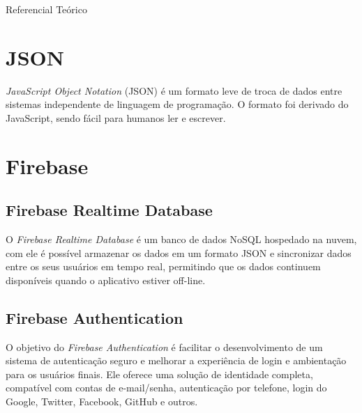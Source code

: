 \documentclass[
	12pt,				%
	openright,			%
	twoside,			%
	a4paper,			%
	english,			%
	french,				%
	spanish,			%
	brazil				%
	]{abntex2}
\begin{document}
\begin{chapter}{Referencial Teórico}
\newpage
\section{JSON}
\textit{JavaScript Object Notation} (JSON) é um formato leve de troca de dados entre sistemas independente de linguagem de programação. O formato foi derivado do JavaScript, sendo fácil para humanos ler e escrever.

\section{Firebase}
\subsection{Firebase Realtime Database} \label{Firebase Realtime Database}
O \textit{Firebase Realtime Database} é um banco de dados NoSQL hospedado na nuvem, com ele é possível armazenar os dados em um formato JSON e sincronizar dados entre os seus usuários em tempo real, permitindo que os dados continuem disponíveis quando o aplicativo estiver off-line.

\subsection{Firebase Authentication}
O objetivo do \textit{Firebase Authentication} é facilitar o desenvolvimento de um sistema de autenticação seguro e melhorar a experiência de login e ambientação para os usuários finais. Ele oferece uma solução de identidade completa, compatível com contas de e-mail/senha, autenticação por telefone, login do Google, Twitter, Facebook, GitHub e outros.

\end{chapter}
\end{document}
